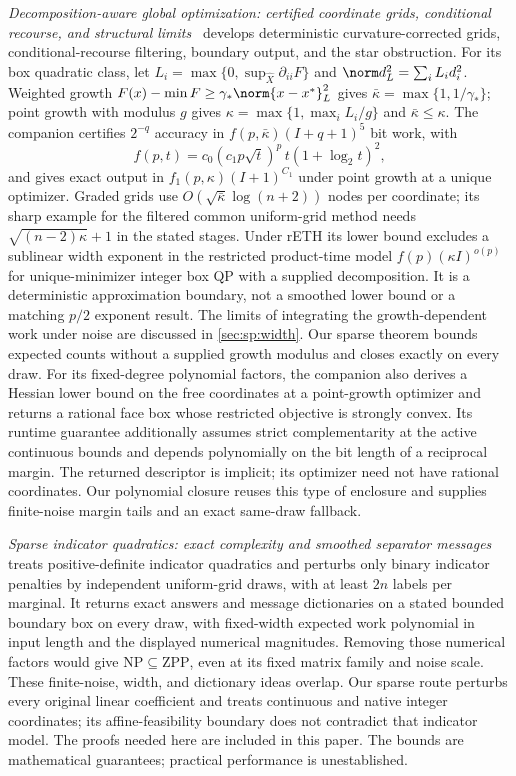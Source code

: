 \emph{Decomposition-aware global optimization: certified coordinate grids,
conditional recourse, and structural limits}~\citep{companion-decomposition-aware}
develops deterministic curvature-corrected grids, conditional-recourse
filtering, boundary output, and the star obstruction. For its box quadratic
class, let $L_i=\max\{0,\sup_{\widehat X}\partial_{ii}F\}$ and
$\norm d_L^2=\sum_iL_id_i^2$. Weighted growth
$F(x)-\min F\ge\gamma_*\norm{x-x^*}_L^2$ gives
$\bar\kappa=\max\{1,1/\gamma_*\}$; point growth with modulus $g$ gives
$\kappa=\max\{1,\max_iL_i/g\}$ and $\bar\kappa\le\kappa$. The companion
certifies $2^{-q}$ accuracy in $f(p,\bar\kappa)(I+q+1)^5$ bit work, with
\[
 f(p,t)=c_0(c_1p\sqrt t)^p\,t(1+\log_2t)^2,
\]
and gives exact output in $f_1(p,\kappa)(I+1)^{C_1}$ under point growth at
a unique optimizer. Graded grids use
$O(\sqrt{\bar\kappa}\log(n+2))$ nodes per coordinate; its sharp example
for the filtered common uniform-grid method needs
$\sqrt{(n-2)\kappa}+1$ in the stated stages. Under rETH its lower bound
excludes a sublinear width exponent in the restricted product-time model
$f(p)(\kappa I)^{o(p)}$ for unique-minimizer integer box QP with a supplied
decomposition. It is a
deterministic approximation boundary, not a smoothed lower bound or a
matching $p/2$ exponent result. The limits of integrating the
growth-dependent work under noise are discussed in \cref{sec:sp:width}.
Our sparse theorem bounds expected counts without a supplied growth modulus
and closes exactly on every draw.
For its fixed-degree polynomial factors, the companion also derives
a Hessian lower bound on the free coordinates at a point-growth optimizer
and returns a rational face box whose restricted objective is strongly
convex. Its runtime guarantee additionally assumes strict complementarity
at the active continuous bounds and depends polynomially on the bit length
of a reciprocal margin. The returned descriptor is implicit; its optimizer
need not have rational coordinates. Our polynomial closure reuses this
type of enclosure and supplies finite-noise margin tails and an exact
same-draw fallback.

\emph{Sparse indicator quadratics: exact complexity and smoothed separator
messages}~\citep{companion-sparse-indicator} treats positive-definite
indicator quadratics and perturbs only binary indicator penalties by
independent uniform-grid draws, with at least $2n$ labels per marginal. It
returns exact answers and message dictionaries on a stated bounded boundary
box on every draw, with fixed-width expected work polynomial in input length
and the displayed numerical magnitudes. Removing those numerical factors
would give $\mathrm{NP}\subseteq\mathrm{ZPP}$, even at its fixed matrix
family and noise scale. These finite-noise, width, and dictionary ideas
overlap. Our sparse route perturbs every original
linear coefficient and treats continuous and native integer coordinates;
its affine-feasibility boundary does not contradict that indicator model.
The proofs needed here are included in this paper. The bounds are
mathematical guarantees; practical performance is unestablished.

